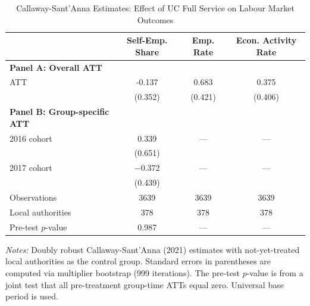 
\begin{table}[htbp]
\centering
\caption{Callaway-Sant'Anna Estimates: Effect of UC Full Service on Labour Market Outcomes}
\label{tab:cs}
\begin{tabular}{lccc}
\toprule
& Self-Emp. Share & Emp. Rate & Econ. Activity Rate \\
\midrule
\textbf{Panel A: Overall ATT} & & & \\
ATT & -0.137 & 0.683 & 0.375 \\
& (0.352) & (0.421) & (0.406) \\
\midrule
\textbf{Panel B: Group-specific ATT} & & & \\
2016 cohort & 0.339 & --- & --- \\
& (0.651) & & \\
2017 cohort & $-$0.372 & --- & --- \\
& (0.439) & & \\
\midrule
Observations & 3639 & 3639 & 3639 \\
Local authorities & 378 & 378 & 378 \\
Pre-test $p$-value & 0.987 & --- & --- \\
\bottomrule
\end{tabular}
\begin{tablenotes}
\small
\item \textit{Notes:} Doubly robust Callaway-Sant'Anna (2021) estimates with not-yet-treated local authorities as the control group. Standard errors in parentheses are computed via multiplier bootstrap (999 iterations). The pre-test $p$-value is from a joint test that all pre-treatment group-time ATTs equal zero. Universal base period is used.
\end{tablenotes}
\end{table}

